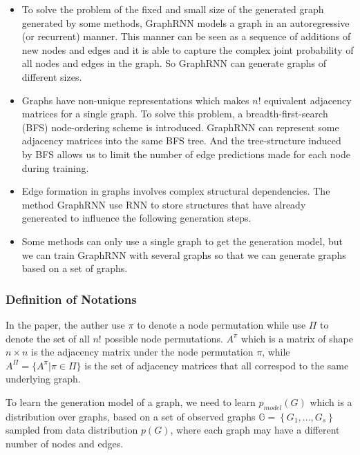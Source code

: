 \begin{survey}
\begin{itemize}
\item
  To solve the problem of the fixed and small size of the generated
  graph generated by some methods, GraphRNN models a graph in an
  autoregressive (or recurrent) manner. This manner can be seen as a
  sequence of additions of new nodes and edges and it is able to capture
  the complex joint probability of all nodes and edges in the graph. So
  GraphRNN can generate graphs of different sizes.
\item
  Graphs have non-unique representations which makes \(n!\) equivalent
  adjacency matrices for a single graph. To solve this problem, a
  breadth-first-search (BFS) node-ordering scheme is introduced.
  GraphRNN can represent some adjacency matrices into the same BFS tree.
  And the tree-structure induced by BFS allows us to limit the number of
  edge predictions made for each node during training.
\item
  Edge formation in graphs involves complex structural dependencies. The
  method GraphRNN use RNN to store structures that have already
  genereated to influence the following generation steps.
\item
  Some methods can only use a single graph to get the generation model,
  but we can train GraphRNN with several graphs so that we can generate
  graphs based on a set of graphs.
\end{itemize}

\vspace{0.2cm}

\subsubsection{Definition of Notations}

In the paper, the auther use \(\pi\) to denote a node permutation while
use \(\Pi\) to denote the set of all \(n!\) possible node permutations.
\(A^\pi\) which is a matrix of shape \(n\times n\) is the adjacency
matrix under the node permutation \(\pi\), while
\(A^{\Pi}=\{A^\pi|\pi \in \Pi \}\) is the set of adjacency matrices that
all correspod to the same underlying graph.

To learn the generation model of a graph, we need to learn
\(p_{model}(G)\) which is a distribution over graphs, based on a set of
observed graphs \(\mathbb{G}=\left\{G_{1}, \ldots, G_{s}\right\}\)
sampled from data distribution \(p(G)\), where each graph may have a
different number of nodes and edges.


\end{survey}
